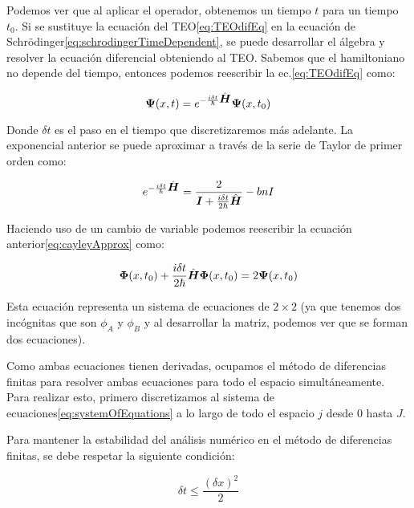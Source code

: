     \noindent Podemos ver que al aplicar el operador, obtenemos un tiempo $t$ para un tiempo $t_0$.
    Si se sustituye la ecuación del TEO\eqref{eq:TEOdifEq} en la ecuación de Schrödinger\eqref{eq:schrodingerTimeDependent}, se puede desarrollar el álgebra y resolver la ecuación diferencial obteniendo al TEO\@.
    Sabemos que el hamiltoniano no depende del tiempo, entonces podemos reescribir la ec.\eqref{eq:TEOdifEq} como:
    
    \begin{equation}
        \label{eq:TEOApplied}
        \mbox{\boldmath $\Psi$}(x,t)= e^{-\frac{i\delta t}{\hbar}\hat{\mbox{\boldmath $H$}}} \mbox{\boldmath $\Psi$}(x,t_0)
    \end{equation}
    
    \noindent Donde $\delta t$ es el paso en el tiempo que discretizaremos más adelante.
    La exponencial anterior se puede aproximar a través de la serie de Taylor de primer orden como:
    
    \begin{equation}
        \label{eq:cayleyApprox}
        e^{-\frac{i\delta t}{\hbar}\hat{\mbox{\boldmath $H$}}} = \frac{2}{\mbox{\boldmath $I$} + \frac{i\delta t}{2\hbar}\hat{\mbox{\boldmath $H$}}}-bn{I}
    \end{equation}

    Haciendo uso de un cambio de variable podemos reescribir la ecuación anterior\eqref{eq:cayleyApprox} como:

    \begin{equation}
        \label{eq:systemOfEquations}
        \mbox{\boldmath $\Phi$}(x,t_0) + \frac{i\delta t}{2\hbar}\hat{\mbox{\boldmath $H$}}\mbox{\boldmath $\Phi$}(x,t_0)=2\mbox{\boldmath $\Psi$}(x,t_0)
    \end{equation}

    \noindent Esta ecuación representa un sistema de ecuaciones de $2\times2$ (ya que tenemos dos incógnitas que son $\phi_A$ y $\phi_B$ y al desarrollar la matriz, podemos ver que se forman dos ecuaciones).

    Como ambas ecuaciones tienen derivadas, ocupamos el método de diferencias finitas para resolver ambas ecuaciones para todo el espacio simultáneamente.
    Para realizar esto, primero discretizamos al sistema de ecuaciones\eqref{eq:systemOfEquations} a lo largo de todo el espacio $j$ desde $0$ hasta $J$.
    
    Para mantener la estabilidad del análisis numérico en el método de diferencias finitas, se debe respetar la siguiente condición\cite{Carrillo2015}:

    \begin{equation}
        \label{eq:stabilityCondition}
        \delta t \leq \frac{\left( \delta x \right)^2}{2}
    \end{equation}

